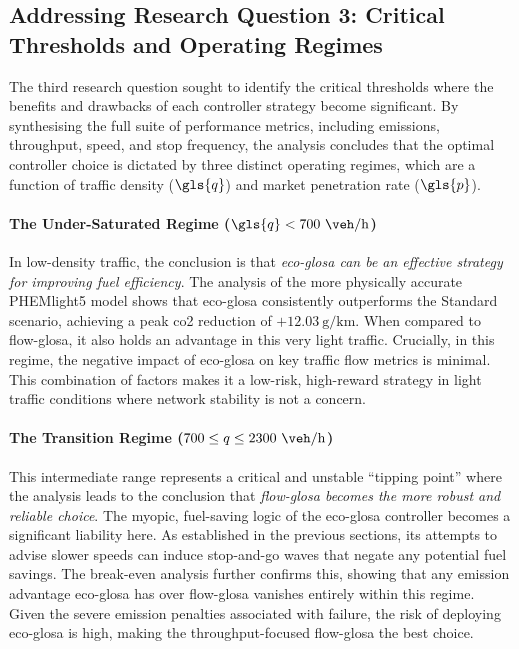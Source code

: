 \subsection*{Addressing Research Question 3: Critical Thresholds and Operating Regimes}
The third research question sought to identify the critical thresholds where the benefits and drawbacks of each controller strategy become significant. By synthesising the full suite of performance metrics, including emissions, throughput, speed, and stop frequency, the analysis concludes that the optimal controller choice is dictated by three distinct operating regimes, which are a function of traffic density ($\gls{q}$) and market penetration rate ($\gls{p}$).

\paragraph{The Under-Saturated Regime ($\gls{q} < 700~\unit{\veh\per\hour}$)}
In low-density traffic, the conclusion is that \textit{\ac{eco-glosa} can be an effective strategy for improving fuel efficiency}. The analysis of the more physically accurate PHEMlight5 model shows that \ac{eco-glosa} consistently outperforms the Standard scenario, achieving a peak \ac{co2} reduction of $+12.03~\unit{\gram\per\kilo\metre}$. When compared to \ac{flow-glosa}, it also holds an advantage in this very light traffic. Crucially, in this regime, the negative impact of \ac{eco-glosa} on key traffic flow metrics is minimal. This combination of factors makes it a low-risk, high-reward strategy in light traffic conditions where network stability is not a concern.

\paragraph{The Transition Regime ($700 \le q \le 2300~\unit{\veh\per\hour}$)}
This intermediate range represents a critical and unstable \enquote{tipping point} where the analysis leads to the conclusion that \textit{\ac{flow-glosa} becomes the more robust and reliable choice}. The myopic, fuel-saving logic of the \ac{eco-glosa} controller becomes a significant liability here. As established in the previous sections, its attempts to advise slower speeds can induce stop-and-go waves that negate any potential fuel savings. The break-even analysis further confirms this, showing that any emission advantage \ac{eco-glosa} has over \ac{flow-glosa} vanishes entirely within this regime. Given the severe emission penalties associated with failure, the risk of deploying \ac{eco-glosa} is high, making the throughput-focused \ac{flow-glosa} the best choice.

